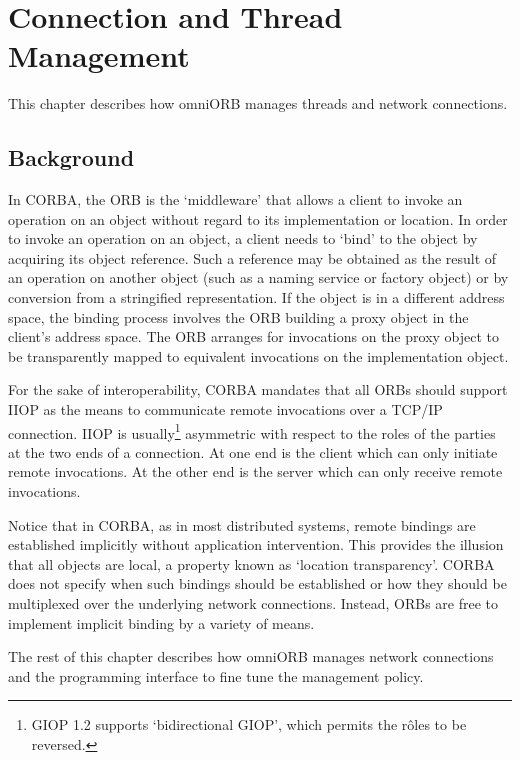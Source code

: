 \documentclass[draft,11pt,twoside,a4paper]{book}
\begin{document}
\chapter{Connection and Thread Management}
\label{chap:connections}


This chapter describes how omniORB manages threads and network
connections.

\section{Background}

In CORBA, the ORB is the `middleware' that allows a client to invoke
an operation on an object without regard to its implementation or
location. In order to invoke an operation on an object, a client needs
to `bind' to the object by acquiring its object reference. Such a
reference may be obtained as the result of an operation on another
object (such as a naming service or factory object) or by conversion
from a stringified representation. If the object is in a different
address space, the binding process involves the ORB building a proxy
object in the client's address space. The ORB arranges for invocations
on the proxy object to be transparently mapped to equivalent
invocations on the implementation object.

For the sake of interoperability, CORBA mandates that all ORBs should
support IIOP as the means to communicate remote invocations over a
TCP/IP connection. IIOP is usually\footnote{GIOP 1.2 supports
`bidirectional GIOP', which permits the r\^oles to be reversed.}
asymmetric with respect to the roles of the parties at the two ends of
a connection. At one end is the client which can only initiate remote
invocations. At the other end is the server which can only receive
remote invocations.

Notice that in CORBA, as in most distributed systems, remote bindings
are established implicitly without application intervention. This
provides the illusion that all objects are local, a property known as
`location transparency'. CORBA does not specify when such bindings
should be established or how they should be multiplexed over the
underlying network connections. Instead, ORBs are free to implement
implicit binding by a variety of means.

The rest of this chapter describes how omniORB manages network
connections and the programming interface to fine tune the management
policy.
\end{document}
